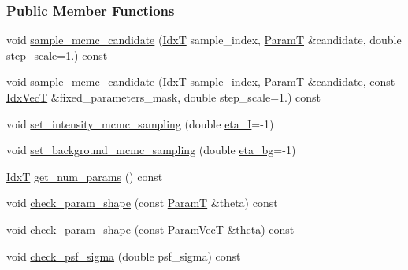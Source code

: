 \subsubsection*{Public Member Functions}
\begin{DoxyCompactItemize}
\item 
void \hyperlink{classmappel_1_1MCMCAdaptor2Ds_a0d9821e431262d6677e814a84f88eb01}{sample\+\_\+mcmc\+\_\+candidate} (\hyperlink{namespacemappel_ab17ec0f30b61ece292439d7ece81d3a8}{IdxT} sample\+\_\+index, \hyperlink{classmappel_1_1PointEmitterModel_a665ec6aea3aac139bb69a23c06d4b9a1}{ParamT} \&candidate, double step\+\_\+scale=1.) const 
\item 
void \hyperlink{classmappel_1_1MCMCAdaptor2Ds_ac9284f30a2b003b5e1381254029da4d1}{sample\+\_\+mcmc\+\_\+candidate} (\hyperlink{namespacemappel_ab17ec0f30b61ece292439d7ece81d3a8}{IdxT} sample\+\_\+index, \hyperlink{classmappel_1_1PointEmitterModel_a665ec6aea3aac139bb69a23c06d4b9a1}{ParamT} \&candidate, const \hyperlink{namespacemappel_ac63743dcd42180127307cd0e4ecdd784}{Idx\+VecT} \&fixed\+\_\+parameters\+\_\+mask, double step\+\_\+scale=1.) const 
\item 
void \hyperlink{classmappel_1_1MCMCAdaptor1D_ac70f768928859b1e9449b0ec1a141c4c}{set\+\_\+intensity\+\_\+mcmc\+\_\+sampling} (double \hyperlink{classmappel_1_1MCMCAdaptor1D_a5780d326be0c40e10d6c91777cfffbd3}{eta\+\_\+I}=-\/1)
\item 
void \hyperlink{classmappel_1_1MCMCAdaptor1D_ae79ee3845fbdd0e378f00eeebf8ccef1}{set\+\_\+background\+\_\+mcmc\+\_\+sampling} (double \hyperlink{classmappel_1_1MCMCAdaptor1D_af54c93421b8e298289cbb92743c6b3d5}{eta\+\_\+bg}=-\/1)
\item 
\hyperlink{namespacemappel_ab17ec0f30b61ece292439d7ece81d3a8}{IdxT} \hyperlink{classmappel_1_1PointEmitterModel_a6fe8129bd24ab5c6620b3ab106b6c91a}{get\+\_\+num\+\_\+params} () const 
\item 
void \hyperlink{classmappel_1_1PointEmitterModel_a97a868e842302f670ed9f9bd49416771}{check\+\_\+param\+\_\+shape} (const \hyperlink{classmappel_1_1PointEmitterModel_a665ec6aea3aac139bb69a23c06d4b9a1}{ParamT} \&theta) const 
\item 
void \hyperlink{classmappel_1_1PointEmitterModel_a54b341a9bc0e32e2c8bbfe4ec0d8c9a1}{check\+\_\+param\+\_\+shape} (const \hyperlink{classmappel_1_1PointEmitterModel_add253b568d763f1513a810aac35de719}{Param\+VecT} \&theta) const 
\item 
void \hyperlink{classmappel_1_1PointEmitterModel_a01ce8d6358acbd2575be519dff1df89b}{check\+\_\+psf\+\_\+sigma} (double psf\+\_\+sigma) const 

\end{DoxyCompactItemize}
